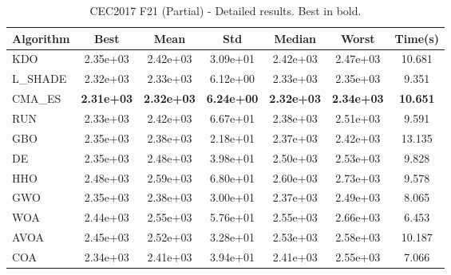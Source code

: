\begin{table}[H]
\centering\small
\caption{CEC2017 F21 (Partial) - Detailed results. Best in bold.}
\label{tab:cec2017_F21}
\begin{tabular}{lcccccc}
\toprule
\textbf{Algorithm} & \textbf{Best} & \textbf{Mean} & \textbf{Std} & \textbf{Median} & \textbf{Worst} & \textbf{Time(s)} \\
\midrule
KDO & 2.35e+03 & 2.42e+03 & 3.09e+01 & 2.42e+03 & 2.47e+03 & 10.681 \\
L_SHADE & 2.32e+03 & 2.33e+03 & 6.12e+00 & 2.33e+03 & 2.35e+03 & 9.351 \\
CMA_ES & \textbf{2.31e+03} & \textbf{2.32e+03} & \textbf{6.24e+00} & \textbf{2.32e+03} & \textbf{2.34e+03} & \textbf{10.651} \\
RUN & 2.33e+03 & 2.42e+03 & 6.67e+01 & 2.38e+03 & 2.51e+03 & 9.591 \\
GBO & 2.35e+03 & 2.38e+03 & 2.18e+01 & 2.37e+03 & 2.42e+03 & 13.135 \\
DE & 2.35e+03 & 2.48e+03 & 3.98e+01 & 2.50e+03 & 2.53e+03 & 9.828 \\
HHO & 2.48e+03 & 2.59e+03 & 6.80e+01 & 2.60e+03 & 2.73e+03 & 9.578 \\
GWO & 2.35e+03 & 2.38e+03 & 3.00e+01 & 2.37e+03 & 2.49e+03 & 8.065 \\
WOA & 2.44e+03 & 2.55e+03 & 5.76e+01 & 2.55e+03 & 2.66e+03 & 6.453 \\
AVOA & 2.45e+03 & 2.52e+03 & 3.28e+01 & 2.53e+03 & 2.58e+03 & 10.187 \\
COA & 2.34e+03 & 2.41e+03 & 3.94e+01 & 2.41e+03 & 2.55e+03 & 7.066 \\
\bottomrule
\end{tabular}
\end{table}
